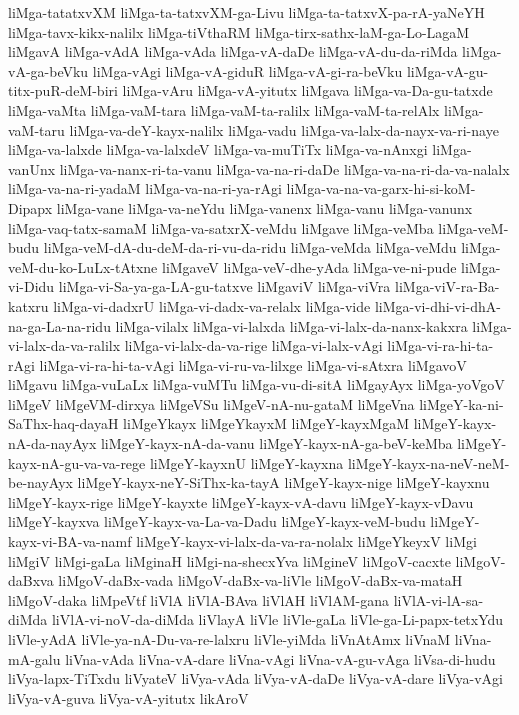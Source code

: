 {liMga-tatatxvXM
liMga-ta-tatxvXM-ga-Livu
liMga-ta-tatxvX-pa-rA-yaNeYH
liMga-tavx-kikx-nalilx
liMga-tiVthaRM
liMga-tirx-sathx-laM-ga-Lo-LagaM
liMgavA
liMga-vAdA
liMga-vAda
liMga-vA-daDe
liMga-vA-du-da-riMda
liMga-vA-ga-beVku
liMga-vAgi
liMga-vA-giduR
liMga-vA-gi-ra-beVku
liMga-vA-gu-titx-puR-deM-biri
liMga-vAru
liMga-vA-yitutx
liMgava
liMga-va-Da-gu-tatxde
liMga-vaMta
liMga-vaM-tara
liMga-vaM-ta-ralilx
liMga-vaM-ta-relAlx
liMga-vaM-taru
liMga-va-deY-kayx-nalilx
liMga-vadu
liMga-va-lalx-da-nayx-va-ri-naye
liMga-va-lalxde
liMga-va-lalxdeV
liMga-va-muTiTx
liMga-va-nAnxgi
liMga-vanUnx
liMga-va-nanx-ri-ta-vanu
liMga-va-na-ri-daDe
liMga-va-na-ri-da-va-nalalx
liMga-va-na-ri-yadaM
liMga-va-na-ri-ya-rAgi
liMga-va-na-va-garx-hi-si-koM-Dipapx
liMga-vane
liMga-va-neYdu
liMga-vanenx
liMga-vanu
liMga-vanunx
liMga-vaq-tatx-samaM
liMga-va-satxrX-veMdu
liMgave
liMga-veMba
liMga-veM-budu
liMga-veM-dA-du-deM-da-ri-vu-da-ridu
liMga-veMda
liMga-veMdu
liMga-veM-du-ko-LuLx-tAtxne
liMgaveV
liMga-veV-dhe-yAda
liMga-ve-ni-pude
liMga-vi-Didu
liMga-vi-Sa-ya-ga-LA-gu-tatxve
liMgaviV
liMga-viVra
liMga-viV-ra-Ba-katxru
liMga-vi-dadxrU
liMga-vi-dadx-va-relalx
liMga-vide
liMga-vi-dhi-vi-dhA-na-ga-La-na-ridu
liMga-vilalx
liMga-vi-lalxda
liMga-vi-lalx-da-nanx-kakxra
liMga-vi-lalx-da-va-ralilx
liMga-vi-lalx-da-va-rige
liMga-vi-lalx-vAgi
liMga-vi-ra-hi-ta-rAgi
liMga-vi-ra-hi-ta-vAgi
liMga-vi-ru-va-lilxge
liMga-vi-sAtxra
liMgavoV
liMgavu
liMga-vuLaLx
liMga-vuMTu
liMga-vu-di-sitA
liMgayAyx
liMga-yoVgoV
liMgeV
liMgeVM-dirxya
liMgeVSu
liMgeV-nA-nu-gataM
liMgeVna
liMgeY-ka-ni-SaThx-haq-dayaH
liMgeYkayx
liMgeYkayxM
liMgeY-kayxMgaM
liMgeY-kayx-nA-da-nayAyx
liMgeY-kayx-nA-da-vanu
liMgeY-kayx-nA-ga-beV-keMba
liMgeY-kayx-nA-gu-va-va-rege
liMgeY-kayxnU
liMgeY-kayxna
liMgeY-kayx-na-neV-neM-be-nayAyx
liMgeY-kayx-neY-SiThx-ka-tayA
liMgeY-kayx-nige
liMgeY-kayxnu
liMgeY-kayx-rige
liMgeY-kayxte
liMgeY-kayx-vA-davu
liMgeY-kayx-vDavu
liMgeY-kayxva
liMgeY-kayx-va-La-va-Dadu
liMgeY-kayx-veM-budu
liMgeY-kayx-vi-BA-va-namf
liMgeY-kayx-vi-lalx-da-va-ra-nolalx
liMgeYkeyxV
liMgi
liMgiV
liMgi-gaLa
liMginaH
liMgi-na-shecxYva
liMgineV
liMgoV-cacxte
liMgoV-daBxva
liMgoV-daBx-vada
liMgoV-daBx-va-liVle
liMgoV-daBx-va-mataH
liMgoV-daka
liMpeVtf
liVlA
liVlA-BAva
liVlAH
liVlAM-gana
liVlA-vi-lA-sa-diMda
liVlA-vi-noV-da-diMda
liVlayA
liVle
liVle-gaLa
liVle-ga-Li-papx-tetxYdu
liVle-yAdA
liVle-ya-nA-Du-va-re-lalxru
liVle-yiMda
liVnAtAmx
liVnaM
liVna-mA-galu
liVna-vAda
liVna-vA-dare
liVna-vAgi
liVna-vA-gu-vAga
liVsa-di-hudu
liVya-lapx-TiTxdu
liVyateV
liVya-vAda
liVya-vA-daDe
liVya-vA-dare
liVya-vAgi
liVya-vA-guva
liVya-vA-yitutx
likAroV
}
